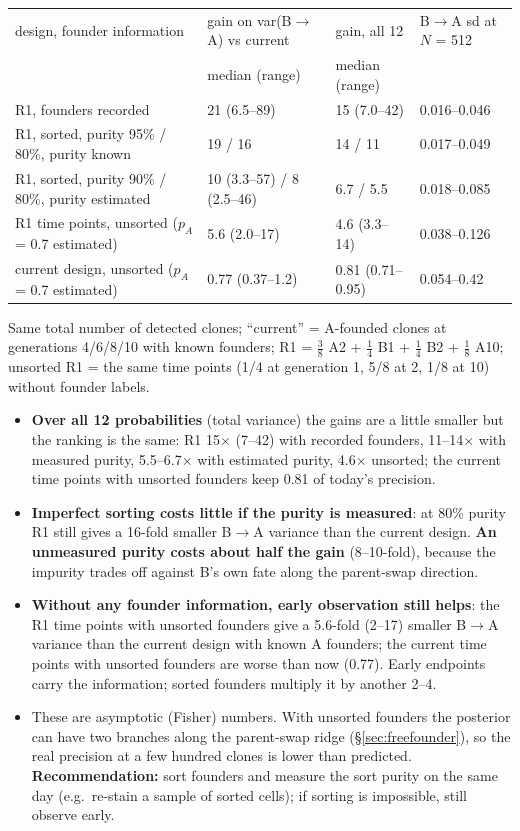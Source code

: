 \documentclass[10pt,a4paper]{article}
\newcommand{\BA}{B$\to$A}
\begin{document}
\begin{center}\footnotesize\setlength{\tabcolsep}{3pt}
\begin{tabular}{@{}llll@{}}\toprule
design, founder information & gain on var(\BA) vs current & gain, all 12 & \BA{} sd at $N$ = 512 \\
 & median (range) & median (range) & \\\midrule
R1, founders recorded & 21 (6.5--89) & 15 (7.0--42) & 0.016--0.046 \\
R1, sorted, purity 95\% / 80\%, purity known & 19 / 16 & 14 / 11 & 0.017--0.049 \\
R1, sorted, purity 90\% / 80\%, purity estimated & 10 (3.3--57) / 8 (2.5--46) & 6.7 / 5.5 & 0.018--0.085 \\
R1 time points, unsorted ($p_A$ = 0.7 estimated) & 5.6 (2.0--17) & 4.6 (3.3--14) & 0.038--0.126 \\
current design, unsorted ($p_A$ = 0.7 estimated) & 0.77 (0.37--1.2) & 0.81 (0.71--0.95) & 0.054--0.42 \\\bottomrule
\end{tabular}

Same total number of detected clones; ``current'' = A-founded clones at generations 4/6/8/10 with known founders; R1 = $\tfrac38$ A2 + $\tfrac14$ B1 + $\tfrac14$ B2 + $\tfrac18$ A10; unsorted R1 = the same time points (1/4 at generation 1, 5/8 at 2, 1/8 at 10) without founder labels.
\end{center}
\begin{itemize}
\item \textbf{Over all 12 probabilities} (total variance) the gains are a little smaller but the ranking is the same: R1 15$\times$ (7--42) with recorded founders, 11--14$\times$ with measured purity, 5.5--6.7$\times$ with estimated purity, 4.6$\times$ unsorted; the current time points with unsorted founders keep 0.81 of today's precision.
\item \textbf{Imperfect sorting costs little if the purity is measured}: at 80\% purity R1 still gives a 16-fold smaller \BA{} variance than the current design. \textbf{An unmeasured purity costs about half the gain} (8--10-fold), because the impurity trades off against B's own fate along the parent-swap direction.
\item \textbf{Without any founder information, early observation still helps}: the R1 time points with unsorted founders give a 5.6-fold (2--17) smaller \BA{} variance than the current design with known A founders; the current time points with unsorted founders are worse than now (0.77). Early endpoints carry the information; sorted founders multiply it by another 2--4.
\item These are asymptotic (Fisher) numbers. With unsorted founders the posterior can have two branches along the parent-swap ridge (\S\ref{sec:freefounder}), so the real precision at a few hundred clones is lower than predicted. \textbf{Recommendation:} sort founders and measure the sort purity on the same day (e.g.\ re-stain a sample of sorted cells); if sorting is impossible, still observe early.
\end{itemize}
\end{document}
